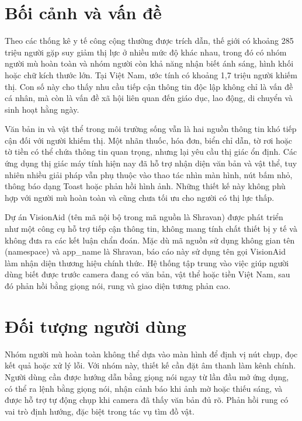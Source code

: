 \documentclass[a4paper,13pt]{report}
\begin{document}
\section{Bối cảnh và vấn đề}

Theo các thống kê y tế công cộng thường được trích dẫn, thế giới có khoảng 285 triệu người gặp suy giảm thị lực ở nhiều mức độ khác nhau, trong đó có nhóm người mù hoàn toàn và nhóm người còn khả năng nhận biết ánh sáng, hình khối hoặc chữ kích thước lớn. Tại Việt Nam, ước tính có khoảng 1,7 triệu người khiếm thị. Con số này cho thấy nhu cầu tiếp cận thông tin độc lập không chỉ là vấn đề cá nhân, mà còn là vấn đề xã hội liên quan đến giáo dục, lao động, di chuyển và sinh hoạt hằng ngày.

Văn bản in và vật thể trong môi trường sống vẫn là hai nguồn thông tin khó tiếp cận đối với người khiếm thị. Một nhãn thuốc, hóa đơn, biển chỉ dẫn, tờ rơi hoặc tờ tiền có thể chứa thông tin quan trọng, nhưng lại yêu cầu thị giác ổn định. Các ứng dụng thị giác máy tính hiện nay đã hỗ trợ nhận diện văn bản và vật thể, tuy nhiên nhiều giải pháp vẫn phụ thuộc vào thao tác nhìn màn hình, nút bấm nhỏ, thông báo dạng Toast hoặc phản hồi hình ảnh. Những thiết kế này không phù hợp với người mù hoàn toàn và cũng chưa tối ưu cho người có thị lực thấp.

Dự án VisionAid (tên mã nội bộ trong mã nguồn là Shravan) được phát triển như một công cụ hỗ trợ tiếp cận thông tin, không mang tính chất thiết bị y tế và không đưa ra các kết luận chẩn đoán. Mặc dù mã nguồn sử dụng không gian tên (namespace) và app\_name là Shravan, báo cáo này sử dụng tên gọi VisionAid làm nhận diện thương hiệu chính thức. Hệ thống tập trung vào việc giúp người dùng biết được trước camera đang có văn bản, vật thể hoặc tiền Việt Nam, sau đó phản hồi bằng giọng nói, rung và giao diện tương phản cao.

\section{Đối tượng người dùng}

Nhóm người mù hoàn toàn không thể dựa vào màn hình để định vị nút chụp, đọc kết quả hoặc xử lý lỗi. Với nhóm này, thiết kế cần đặt âm thanh làm kênh chính. Người dùng cần được hướng dẫn bằng giọng nói ngay từ lần đầu mở ứng dụng, có thể ra lệnh bằng giọng nói, nhận cảnh báo khi ảnh mờ hoặc thiếu sáng, và được hỗ trợ tự động chụp khi camera đã thấy văn bản đủ rõ. Phản hồi rung có vai trò định hướng, đặc biệt trong tác vụ tìm đồ vật.
\end{document}
